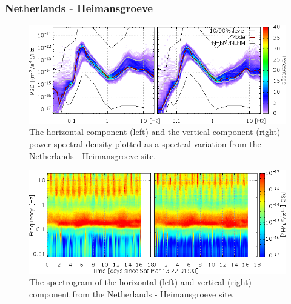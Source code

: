 \subsubsection*{Netherlands - Heimansgroeve}
\begin{figure}[h]
\centering
\includegraphics[width=\textwidth]{./Sec_SiteInfra/Figures/results/Heimans-A_multiplot1}
\caption{The horizontal component (left) and the vertical component (right) power spectral density plotted as a spectral variation from the Netherlands - Heimansgroeve site.}
\label{fig:Heimans-A_multiplot1}
\end{figure}\begin{figure}[h]
\centering
\includegraphics[width=\textwidth]{./Sec_SiteInfra/Figures/results/Heimans-A_multiplot2}
\caption{The spectrogram of the horizontal (left) and vertical (right) component from the Netherlands - Heimansgroeve site.}
\label{fig:Heimans-A_multiplot2}
\end{figure}

\pagebreak
\FloatBarrier
